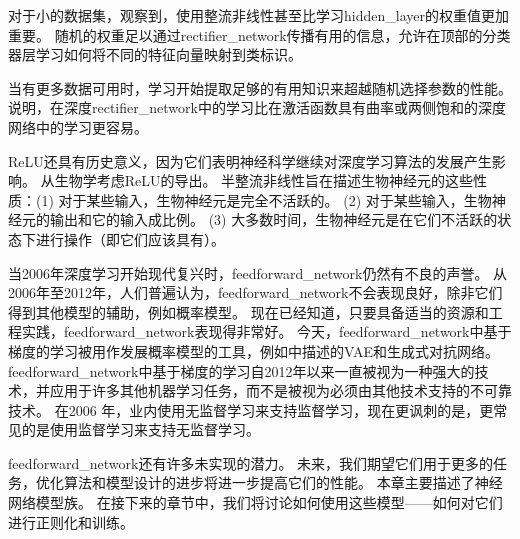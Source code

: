 对于小的数据集，\cite{Jarrett-et-al-2009}观察到，使用整流非线性甚至比学习\gls{hidden_layer}的权重值更加重要。
随机的权重足以通过\gls{rectifier_network}传播有用的信息，允许在顶部的分类器层学习如何将不同的特征向量映射到类标识。

当有更多数据可用时，学习开始提取足够的有用知识来超越随机选择参数的性能。
\cite{Glorot-et-al-2011a}说明，在深度\gls{rectifier_network}中的学习比在激活函数具有曲率或两侧饱和的深度网络中的学习更容易。

\gls{ReLU}还具有历史意义，因为它们表明神经科学继续对深度学习算法的发展产生影响。
\cite{Glorot-et-al-2011a}从生物学考虑\gls{ReLU}的导出。
半整流非线性旨在描述生物神经元的这些性质：(1) 对于某些输入，生物神经元是完全不活跃的。
(2) 对于某些输入，生物神经元的输出和它的输入成比例。
(3) 大多数时间，生物神经元是在它们不活跃的状态下进行操作（即它们应该具有）。
  
  
当2006年深度学习开始现代复兴时，\gls{feedforward_network}仍然有不良的声誉。
从2006年至2012年，人们普遍认为，\gls{feedforward_network}不会表现良好，除非它们得到其他模型的辅助，例如概率模型。
现在已经知道，只要具备适当的资源和工程实践，\gls{feedforward_network}表现得非常好。
今天，\gls{feedforward_network}中基于梯度的学习被用作发展概率模型的工具，例如中描述的\gls{VAE}和生成式对抗网络。
\gls{feedforward_network}中基于梯度的学习自2012年以来一直被视为一种强大的技术，并应用于许多其他机器学习任务，而不是被视为必须由其他技术支持的不可靠技术。
在2006 年，业内使用无监督学习来支持监督学习，现在更讽刺的是，更常见的是使用监督学习来支持无监督学习。

\gls{feedforward_network}还有许多未实现的潜力。
未来，我们期望它们用于更多的任务，优化算法和模型设计的进步将进一步提高它们的性能。
本章主要描述了神经网络模型族。
在接下来的章节中，我们将讨论如何使用这些模型——如何对它们进行正则化和训练。

  
  
